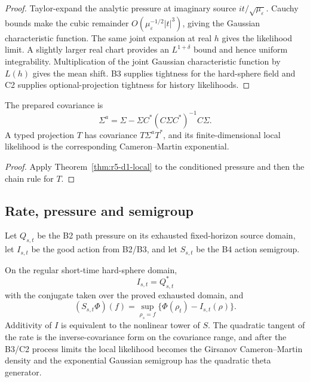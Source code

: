 \begin{proof}
Taylor-expand the analytic pressure at imaginary source
\(it/\sqrt{\mu_\varepsilon}\).  Cauchy bounds make the cubic remainder
\(O(\mu_\varepsilon^{-1/2}|t|^3)\), giving the Gaussian characteristic
function.  The same joint expansion at real \(h\) gives the likelihood limit.
A slightly larger real chart provides an \(L^{1+\delta}\) bound and hence
uniform integrability.  Multiplication of the joint Gaussian characteristic
function by \(L(h)\) gives the mean shift.  B3 supplies tightness for the
hard-sphere field and C2 supplies optional-projection tightness for history
likelihoods.
\end{proof}

\begin{corollary}
\label{cor:r5-d1-conditioned}
The prepared covariance is
\[
 \Sigma^a=\Sigma-
 \Sigma C^*(C\Sigma C^*)^{-1}C\Sigma.
\]
A typed projection \(T\) has covariance
\(T\Sigma^aT^*\), and its finite-dimensional local likelihood is the
corresponding Cameron--Martin exponential.
\end{corollary}

\begin{proof}
Apply Theorem~\ref{thm:r5-d1-local} to the conditioned pressure and then the
chain rule for \(T\).
\end{proof}

\subsection{Rate, pressure and semigroup}

Let \(Q_{s,t}\) be the B2 path pressure on its exhausted fixed-horizon source
domain, let \(I_{s,t}\) be the good action from B2/B3, and let \(S_{s,t}\) be
the B4 action semigroup.

\begin{theorem}
\label{thm:r5-d1-triangle}
On the regular short-time hard-sphere domain,
\[
 I_{s,t}=Q_{s,t}^*
\]
with the conjugate taken over the proved exhausted domain, and
\[
 (S_{s,t}\Phi)(f)=
 \sup_{\rho_s=f}\{\Phi(\rho_t)-I_{s,t}(\rho)\}.
\]
Additivity of \(I\) is equivalent to the nonlinear tower of \(S\).  The
quadratic tangent of the rate is the inverse-covariance form on the covariance
range, and after the B3/C2 process limits the local likelihood becomes the
Girsanov Cameron--Martin density and the exponential Gaussian semigroup has
the quadratic theta generator.
\end{theorem}

